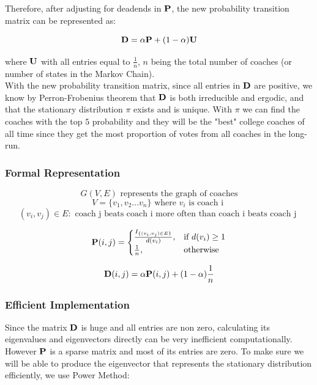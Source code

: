\documentclass[11pt,notitlepage]{article}
\begin{document}
\noindent Therefore, after adjusting for deadends in ${\bf P}$, the new probability transition matrix can be represented as:

$${\bf D} = \alpha {\bf P} + (1 - \alpha) {\bf U}$$

\noindent where $\bf{U}$ with all entries equal to $\frac{1}{n}$, $n$ being the total number of coaches (or number of states in the Markov Chain).
\\

\noindent With the new probability transition matrix, since all entries in $\bf{D}$ are positive, we know by Perron-Frobenius theorem that $\bf{D}$ is both irreducible and ergodic, and that the stationary distribution $\pi$ exists and is unique. With $\pi$ we can find the coaches with the top $5$ probability and they will be the "best" college coaches of all time since they get the most proportion of votes from all coaches in the long-run.

\subsubsection*{Formal Representation}

$$G(V, E) \mbox{ represents the graph of coaches}$$
$$V = \{v_1, v_2 ... v_n\} \mbox{ where } v_i \mbox{ is coach i }$$
$$(v_i, v_j) \in E : \mbox{ coach j beats coach i more often than coach i beats coach j }$$



\[
    {\bf P} (i, j)= 
\begin{cases}
    \frac{ I_{\{(v_i, v_j) \in E\}}}{d(v_i)},& \text{if } d(v_i) \geq 1\\
    \frac{1}{n},              & \text{otherwise}
\end{cases}
\]

$${\bf D} (i, j) = \alpha {\bf P} (i, j)  + (1-\alpha)\frac{1}{n}$$


\subsubsection*{Efficient Implementation}


Since the matrix ${\bf D}$ is huge and all entries are non zero, calculating its eigenvalues and eigenvectors directly can be very inefficient computationally. However ${\bf P}$ is a sparse matrix and most of its entries are zero. To make sure we will be able to produce the eigenvector that represents the stationary distribution efficiently, we use Power Method:
\end{document}
